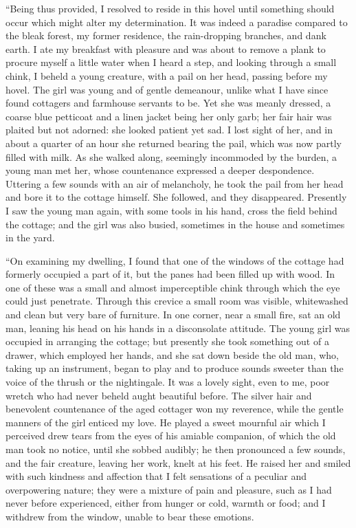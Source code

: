 \documentclass[12pt,openright]{book}
\begin{document}
“Being thus provided, I resolved to reside in this hovel until something should occur which might alter my determination. It was indeed a paradise compared to the bleak forest, my former residence, the rain-dropping branches, and dank earth. I ate my breakfast with pleasure and was about to remove a plank to procure myself a little water when I heard a step, and looking through a small chink, I beheld a young creature, with a pail on her head, passing before my hovel. The girl was young and of gentle demeanour, unlike what I have since found cottagers and farmhouse servants to be. Yet she was meanly dressed, a coarse blue petticoat and a linen jacket being her only garb; her fair hair was plaited but not adorned: she looked patient yet sad. I lost sight of her, and in about a quarter of an hour she returned bearing the pail, which was now partly filled with milk. As she walked along, seemingly incommoded by the burden, a young man met her, whose countenance expressed a deeper despondence. Uttering a few sounds with an air of melancholy, he took the pail from her head and bore it to the cottage himself. She followed, and they disappeared. Presently I saw the young man again, with some tools in his hand, cross the field behind the cottage; and the girl was also busied, sometimes in the house and sometimes in the yard.

“On examining my dwelling, I found that one of the windows of the cottage had formerly occupied a part of it, but the panes had been filled up with wood. In one of these was a small and almost imperceptible chink through which the eye could just penetrate. Through this crevice a small room was visible, whitewashed and clean but very bare of furniture. In one corner, near a small fire, sat an old man, leaning his head on his hands in a disconsolate attitude. The young girl was occupied in arranging the cottage; but presently she took something out of a drawer, which employed her hands, and she sat down beside the old man, who, taking up an instrument, began to play and to produce sounds sweeter than the voice of the thrush or the nightingale. It was a lovely sight, even to me, poor wretch who had never beheld aught beautiful before. The silver hair and benevolent countenance of the aged cottager won my reverence, while the gentle manners of the girl enticed my love. He played a sweet mournful air which I perceived drew tears from the eyes of his amiable companion, of which the old man took no notice, until she sobbed audibly; he then pronounced a few sounds, and the fair creature, leaving her work, knelt at his feet. He raised her and smiled with such kindness and affection that I felt sensations of a peculiar and overpowering nature; they were a mixture of pain and pleasure, such as I had never before experienced, either from hunger or cold, warmth or food; and I withdrew from the window, unable to bear these emotions.
\end{document}
